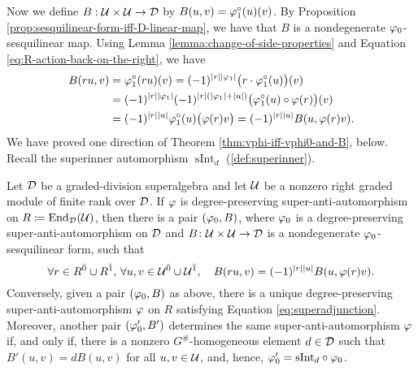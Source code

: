 Now we define $B: \mathcal U\times \mathcal U \to \mathcal{D}$ by $B(u, v) = \varphi_1^\circ (u)(v)$.
By Proposition \ref{prop:sesquilinear-form-iff-D-linear-map}, we have that $B$ is a nondegenerate $\varphi_0$-sesquilinear map.
Using Lemma \ref{lemma:change-of-side-properties} and Equation \eqref{eq:R-action-back-on-the-right}, we have
%
\begin{equation*}
	\begin{split}
		B(ru,v) &= \varphi_1^\circ (ru)(v) = (-1)^{|r||\varphi_1|} \big(r \cdot \varphi_1^\circ (u) \big) (v)\\ &= (-1)^{|r||\varphi_1|} (-1)^{|r|(|\varphi_1| + |u|)} \big(\varphi_1^\circ (u) \circ \varphi(r) \big)(v) \\ &= (-1)^{|r||u|} \varphi_1^\circ (u) \big( \varphi(r)v \big)= (-1)^{|r||u|} B(u,\varphi(r)v).
	\end{split}
\end{equation*}
We have proved one direction of Theorem \ref{thm:vphi-iff-vphi0-and-B}, below. 
Recall the superinner automorphism $\operatorname{sInt}_d$ (\cref{def:superinner}). 

\begin{thm}\label{thm:vphi-iff-vphi0-and-B}
	Let $\mathcal{D}$ be a graded-division superalgebra and let $\mathcal U$ be a nonzero right graded module of finite rank over $\mathcal{D}$.
	If $\varphi$ is degree-preserving super-anti-automorphism on $R \coloneqq \operatorname{End}_{\mathcal{D}}(\mathcal U)$, then there is a pair $(\varphi_0, B)$, where $\varphi_0$ is a degree-preserving super-anti-automorphism on $\mathcal{D}$ and $B\colon \mathcal U \times \mathcal U \to \mathcal{D}$ is a nondegenerate $\varphi_0$-sesquilinear form, such that
	\begin{equation}\label{eq:superadjunction}
		\forall r\in R^{\bar0} \cup R^{\bar1},\,\forall u, v \in \mathcal U^{\bar0} \cup \mathcal U^{\bar1},  \quad B(ru,v) = (-1)^{|r||u|} B(u,\varphi(r)v).
	\end{equation}
	Conversely, given a pair $(\varphi_0, B)$ as above, there is a unique degree-preserving super-anti-automorphism $\varphi$ on $R$ satisfying Equation \eqref{eq:superadjunction}.
	Moreover, another pair $(\varphi_0', B')$ determines the same super-anti-automorphism $\varphi$ if, and only if, there is a nonzero $G^\#$-homogeneous element $d\in \mathcal{D}$ such that $B'(u, v) = dB (u, v)$ for all $u, v \in \mathcal U$, and, hence, $\varphi_0' = \mathrm{sInt}_d \circ \varphi_0$.
\end{thm}

